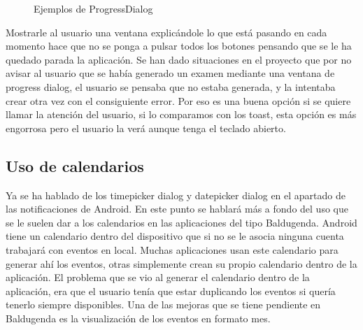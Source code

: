 \begin{figure}[H] 
  \begin{center} 
    \caption{Ejemplos de ProgressDialog} 
    \label{fig:ProgressDialog} 
  \end{center} 
\end{figure}

Mostrarle al usuario una ventana explicándole lo que está pasando en cada momento hace que no se ponga a pulsar todos los botones pensando que se le ha quedado parada la aplicación.
Se han dado situaciones en el proyecto que por no avisar al usuario que se había generado un examen mediante una ventana de progress dialog, el usuario se pensaba que no estaba generada, y la intentaba crear otra vez con el consiguiente error.
Por eso es una buena opción si se quiere llamar la atención del usuario, si lo comparamos con los toast, esta opción es más engorrosa pero el usuario la verá aunque tenga el teclado abierto.

\subsection{Uso de calendarios}
\label{subsecc:Uso de calendarios}

Ya se ha hablado de los timepicker dialog y datepicker dialog en el apartado de las notificaciones de Android.
En este punto se hablará más a fondo del uso que se le suelen dar a los calendarios en las aplicaciones del tipo Baldugenda.
Android tiene un calendario dentro del dispositivo que si no se le asocia ninguna cuenta trabajará con eventos en local. Muchas aplicaciones usan este calendario para generar ahí los eventos, otras simplemente crean su propio calendario dentro de la aplicación.
El problema que se vio al generar el calendario dentro de la aplicación, era que el usuario tenía que estar duplicando los eventos si quería tenerlo siempre disponibles.
Una de las mejoras que se tiene pendiente en Baldugenda es la visualización de los eventos en formato mes.

